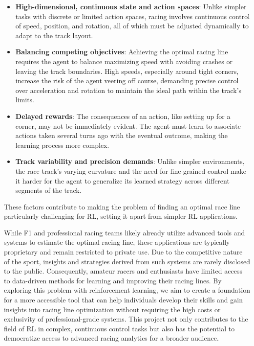 \documentclass{article}
\begin{document}
\begin{itemize}
    \item \textbf{High-dimensional, continuous state and action spaces}: Unlike simpler tasks with discrete or limited action spaces, racing involves continuous control of speed, position, and rotation, all of which must be adjusted dynamically to adapt to the track layout.
    
    \item \textbf{Balancing competing objectives}: Achieving the optimal racing line requires the agent to balance maximizing speed with avoiding crashes or leaving the track boundaries. High speeds, especially around tight corners, increase the risk of the agent veering off course, demanding precise control over acceleration and rotation to maintain the ideal path within the track’s limits.
    
    \item \textbf{Delayed rewards}: The consequences of an action, like setting up for a corner, may not be immediately evident. The agent must learn to associate actions taken several turns ago with the eventual outcome, making the learning process more complex.
    
    \item \textbf{Track variability and precision demands}: Unlike simpler environments, the race track’s varying curvature and the need for fine-grained control make it harder for the agent to generalize its learned strategy across different segments of the track.
\end{itemize}

These factors contribute to making the problem of finding an optimal race line particularly challenging for RL, setting it apart from simpler RL applications.

While F1 and professional racing teams likely already utilize advanced tools and systems to estimate the optimal racing line, these applications are typically proprietary and remain restricted to private use. Due to the competitive nature of the sport, insights and strategies derived from such systems are rarely disclosed to the public. Consequently, amateur racers and enthusiasts have limited access to data-driven methods for learning and improving their racing lines. By exploring this problem with reinforcement learning, we aim to create a foundation for a more accessible tool that can help individuals develop their skills and gain insights into racing line optimization without requiring the high costs or exclusivity of professional-grade systems. This project not only contributes to the field of RL in complex, continuous control tasks but also has the potential to democratize access to advanced racing analytics for a broader audience.
\end{document}
